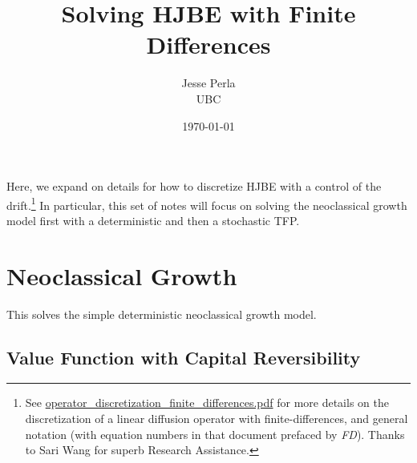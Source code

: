 \documentclass[11pt]{etk-article}
\begin{document}
\title{Solving HJBE with Finite Differences}
\author{Jesse Perla\\UBC}
\date{\today}
\maketitle
 Here, we expand on details for how to discretize HJBE with a control of the drift.\footnote{See \url{operator_discretization_finite_differences.pdf} for more details on the discretization of a linear diffusion operator with finite-differences, and general notation (with equation numbers in that document prefaced by \textit{FD}). Thanks to Sari Wang for superb Research Assistance.}  In particular, this set of notes will focus on solving the neoclassical growth model first with a deterministic and then a stochastic TFP.
 
 \section{Neoclassical Growth}
 This solves the simple deterministic neoclassical growth model.
 \subsection{Value Function with Capital Reversibility}
 
\end{document}
